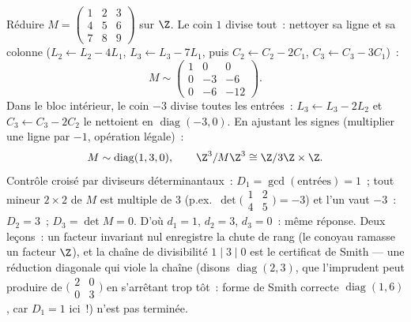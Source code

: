 \begin{example}
\label{ex:b3:modules:smithworked}
Réduire $M = \begin{pmatrix} 1 & 2 & 3\\ 4 & 5 & 6\\ 7 & 8 & 9
\end{pmatrix}$ sur $\Z$. Le coin $1$ divise tout~: nettoyer sa
ligne et sa colonne ($L_2 \leftarrow L_2 - 4L_1$, $L_3
\leftarrow L_3 - 7L_1$, puis $C_2 \leftarrow C_2 - 2C_1$, $C_3
\leftarrow C_3 - 3C_1$)~:
\[
M \sim \begin{pmatrix} 1 & 0 & 0\\ 0 & -3 & -6\\ 0 & -6 & -12
\end{pmatrix} .
\]
Dans le bloc intérieur, le coin $-3$ divise toutes les
entrées~: $L_3 \leftarrow L_3 - 2L_2$ et $C_3 \leftarrow C_3 -
2C_2$ le nettoient en $\operatorname{diag}(-3, 0)$. En ajustant
les signes (multiplier une ligne par $-1$, opération légale)~:
\[
M \sim \operatorname{diag}(1, 3, 0),
\qquad
\Z^3/M\Z^3 \cong \Z/3\Z \times \Z .
\]
Contrôle croisé par diviseurs déterminantaux~: $D_1 =
\gcd(\text{entrées}) = 1$~; tout mineur $2\times2$ de $M$ est
multiple de $3$ (p.ex.\ $\det\bigl(\begin{smallmatrix}1 & 2\\ 4
& 5\end{smallmatrix}\bigr) = -3$) et l'un vaut $-3$~: $D_2 =
3$~; $D_3 = \det M = 0$. D'où $d_1 = 1$, $d_2 = 3$, $d_3 = 0$~:
même réponse. Deux leçons~: un facteur invariant nul enregistre
la chute de rang (le conoyau ramasse un facteur  $\Z$), et
la chaîne de divisibilité $1 \mid 3 \mid 0$ est le certificat
de Smith --- une réduction diagonale qui viole la chaîne (disons
$\operatorname{diag}(2, 3)$, que l'imprudent peut produire de
$\bigl(\begin{smallmatrix}2 & 0\\ 0 &
3\end{smallmatrix}\bigr)$ en s'arrêtant trop tôt~: forme de
Smith correcte $\operatorname{diag}(1, 6)$, car $D_1 = 1$
ici~!) n'est pas terminée.
\end{example}

